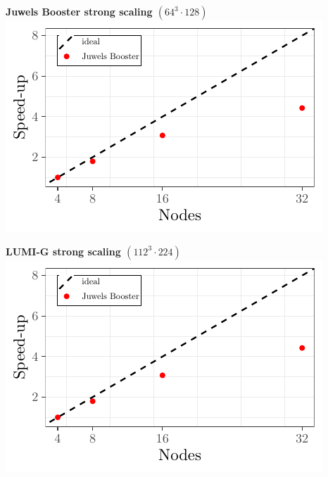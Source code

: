 \documentclass[a0,portrait]{a0poster}
\begin{document}
\begin{multicols}{2}
    \begin{minipage}{0.5\linewidth}
      \centering
      \textbf{Juwels Booster strong scaling $(64^3 \cdot 128)$}\\
      \includegraphics[width=0.80\linewidth,page=1]{data/tmLQCD_scaling/HMC_Scaling}\\
    \end{minipage}
    \begin{minipage}{0.5\linewidth}
      \centering
      \textbf{LUMI-G strong scaling $(112^3 \cdot 224)$}\\
      \includegraphics[width=0.80\linewidth,page=2]{data/tmLQCD_scaling/HMC_Scaling}\\
    \end{minipage}
    
    



    \color{SaddleBrown} %


\end{multicols}
\end{document}
